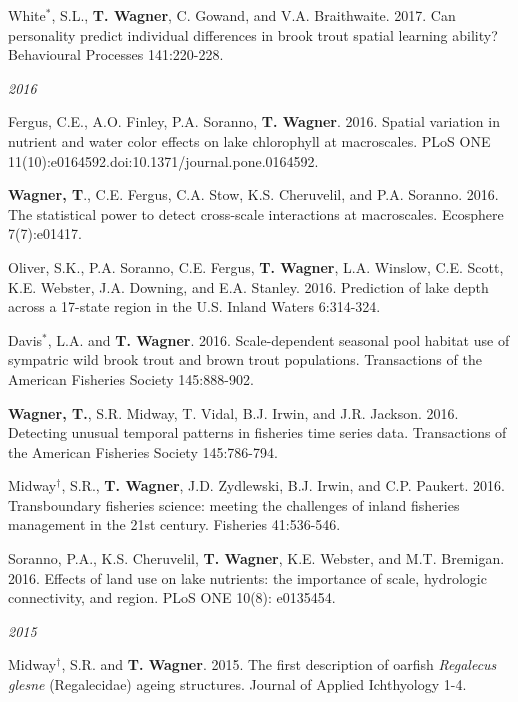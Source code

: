 \documentclass[10pt]{article}
\begin{document}
\begin{flushleft}
\begin{etaremune}[start=72]
\item White$^*$, S.L., {\bf T. Wagner}, C. Gowand, and V.A. Braithwaite. 2017. Can personality predict individual differences in brook trout spatial learning ability? Behavioural Processes 141:220-228. 

\end{etaremune}
\emph{2016}
\begin{etaremune}[start=55]

\item Fergus, C.E., A.O. Finley, P.A. Soranno, {\bf T. Wagner}. 2016. Spatial variation in nutrient and water color effects on lake chlorophyll at macroscales. PLoS ONE 11(10):e0164592.doi:10.1371/journal.pone.0164592.

\item {\bf Wagner, T}., C.E. Fergus, C.A. Stow, K.S. Cheruvelil, and P.A. Soranno. 2016. The statistical power to detect cross-scale interactions at macroscales. Ecosphere 7(7):e01417.

\item Oliver, S.K., P.A. Soranno, C.E. Fergus, {\bf T. Wagner}, L.A. Winslow, C.E. Scott, K.E. Webster, J.A. Downing, and E.A. Stanley. 2016. Prediction of lake depth across a 17-state region in the U.S. Inland Waters 6:314-324.

\item Davis$^*$, L.A. and {\bf T. Wagner}. 2016. Scale-dependent seasonal pool habitat use of sympatric wild brook trout and brown trout populations. Transactions of the American Fisheries Society 145:888-902.

\item {\bf Wagner, T.}, S.R. Midway, T. Vidal, B.J. Irwin, and J.R. Jackson. 2016. Detecting unusual temporal patterns in fisheries time series data. Transactions of the American Fisheries Society 145:786-794.

\item Midway$^\dagger$, S.R., {\bf T. Wagner}, J.D. Zydlewski, B.J. Irwin, and C.P. Paukert. 2016. Transboundary fisheries science: meeting the challenges of inland fisheries management in the 21st century. Fisheries 41:536-546.

\item Soranno, P.A., K.S. Cheruvelil, {\bf T. Wagner}, K.E. Webster, and M.T. Bremigan. 2016. Effects of land use on lake nutrients: the importance of scale, hydrologic connectivity, and region. PLoS ONE  10(8): e0135454.

\end{etaremune}
\emph{2015}
\begin{etaremune}[start=48]
\item Midway$^\dagger$, S.R. and {\bf T. Wagner}. 2015. The first description of oarfish \emph{Regalecus glesne} (Regalecidae) ageing structures. Journal of Applied Ichthyology 1-4.


\end{etaremune}
\end{flushleft}
\end{document}
